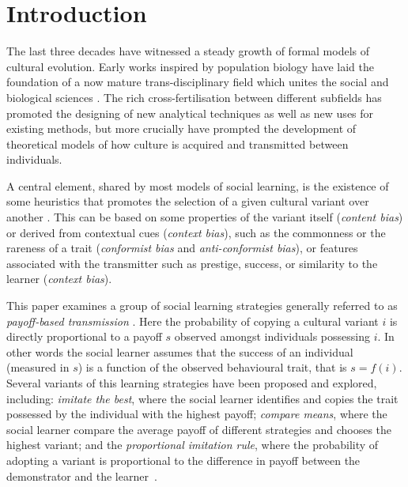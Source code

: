 \documentclass[review,authoryear]{elsarticle}
\begin{document}
\section{Introduction}

The last three decades have witnessed a steady growth of formal models of cultural evolution. Early works inspired by population biology \citep{cavallisforza_feldman_1981,boyd1985} have laid the foundation of a now mature trans-disciplinary field which unites the social and biological sciences \citep{mesoudi_etal_2006}. The rich cross-fertilisation between different subfields has promoted the designing of new analytical techniques as well as new uses for existing methods, but more crucially have prompted the development of theoretical models of how culture is acquired and transmitted between individuals. %

A central element, shared by most models of social learning, is the existence of some heuristics that promotes the selection of a given cultural variant over another \citep{laland2004}. This can be based on some properties of the variant itself (\emph{content bias}) or derived from contextual cues (\emph{context bias}), such as the commonness or the rareness of a trait (\emph{conformist bias} and \emph{anti-conformist bias}), or  features associated with the transmitter such as prestige, success, or similarity to the learner (\emph{context bias})\citep{henrich_mcelreath2003}. 

This paper examines a group of social learning strategies generally referred to as \emph{payoff-based transmission} \citep{schlag1998,kendal_etal_2009,lake_and_crema_2012,baldini2013,kandler_and_laland_2013,crema_lake_inpress}. Here the probability of copying a cultural variant $i$ is directly proportional to a payoff $s$ observed amongst individuals possessing $i$. In other words the social learner assumes that the success of an individual (measured in $s$) is a function of the observed behavioural trait, that is $s=f(i)$. Several variants of this learning strategies have been proposed and explored, including: \emph{imitate the best}, where the social learner identifies and copies the trait possessed by the individual with the highest payoff; \emph{compare means}, where the social learner compare the average payoff of different strategies and chooses the highest variant; and the \emph{proportional imitation rule}, where the probability of adopting a variant is proportional to the difference in payoff between the demonstrator and the learner~\citep{schlag1998,baldini2013,crema_lake_inpress}. 
\end{document}
